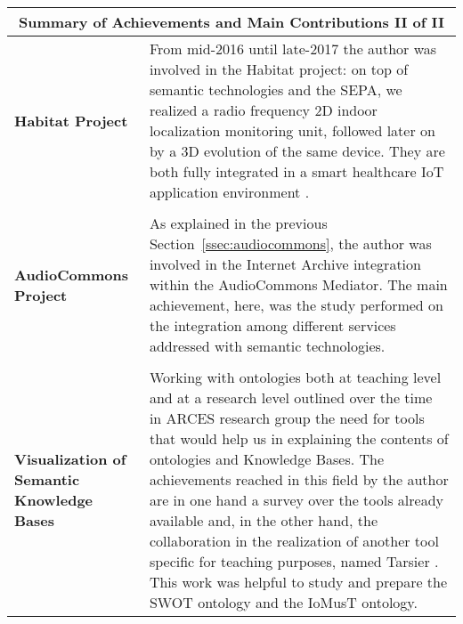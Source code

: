 \documentclass[11pt, twoside, openright]{report}   	%
\begin{document}
\begin{center}
\begin{tabular}{p{}p{}}
\toprule
\multicolumn{2}{c}{\Large \textbf{Summary of Achievements and Main Contributions II of II}} \\
\midrule
\textbf{Habitat Project} & From mid-2016 until late-2017 the author was involved in the Habitat project: on top of semantic technologies and the SEPA, we realized a radio frequency 2D indoor localization monitoring unit, followed later on by a 3D evolution of the same device. They are both fully integrated in a smart healthcare IoT application environment \cite{borelli2019habitat}. \\
& \\
\textbf{AudioCommons Project} & As explained in the previous Section~\ref{ssec:audiocommons}, the author was involved in the Internet Archive integration within the AudioCommons Mediator. The main achievement, here, was the study performed on the integration among different services addressed with semantic technologies. \\
& \\
\textbf{Visualization of \mbox{Semantic} Knowledge Bases} & Working with ontologies both at teaching level and at a research level outlined over the time in ARCES research group the need for tools that would help us in explaining the contents of ontologies and Knowledge Bases. The achievements reached in this field by the author are in one hand a survey over the tools already available \cite{antoniazzi2018rdf} and, in the other hand, the collaboration in the realization of another tool specific for teaching purposes, named Tarsier \cite{viola2018interactive}. This work was helpful to study and prepare the SWOT ontology and the IoMusT ontology.\\
\bottomrule
\end{tabular}
\end{center}
\vspace*{\fill}


\makeatletter
\end{document}
